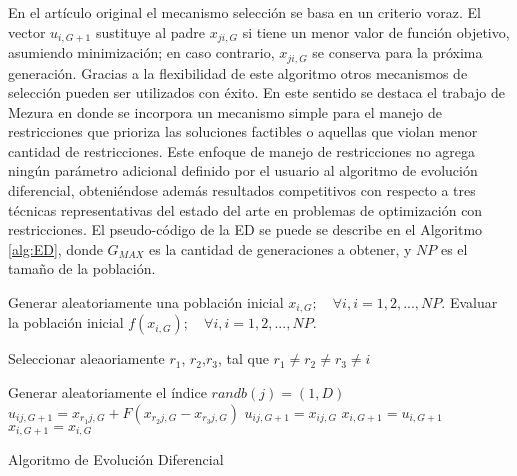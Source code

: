 En el artículo original el mecanismo selección se basa en un criterio voraz. El vector $u_{i,G+1}$ sustituye al padre  $x_{ji,G}$ si tiene un menor valor de función objetivo, asumiendo minimización; en caso contrario, $x_{ji,G}$ se conserva para la próxima generación. Gracias a la flexibilidad de este algoritmo otros mecanismos de selección pueden ser utilizados con éxito. En este sentido se destaca el trabajo de Mezura en \cite{mezura2004simple} donde se incorpora un mecanismo simple para el manejo de restricciones que prioriza las soluciones factibles o aquellas que violan menor cantidad de restricciones. Este enfoque de manejo de restricciones no agrega ningún parámetro adicional definido por el usuario al algoritmo de evolución diferencial, obteniéndose además resultados competitivos con respecto a tres técnicas representativas del estado del arte en problemas de optimización con restricciones. El pseudo-código de la ED se puede se describe en el Algoritmo \ref{alg:ED}, donde $G_{MAX}$ es la cantidad de generaciones a obtener, y $NP$ es el tamaño de la población.
\begin{algorithm}
	\begin{algorithmic}[1]
		\STATE Generar aleatoriamente una población inicial $x_{i,G}; \quad \forall i,i = 1, 2, ..., NP$. 
        \STATE Evaluar la población inicial $f(x_{i,G}); \quad  \forall i,i = 1, 2, ..., NP$. 

             \STATE Seleccionar aleaoriamente $r_1$, $r_2$,$r_3$, tal que $ r_1 \neq r_2 \neq r_3  \neq i$
             
             \STATE Generar aleatoriamente el índice $randb(j)=(1,D)$ 
              	\STATE $u_{ij,G+1} = x_{r_1j,G} + F (x_{r_2 j ,G}-x_{r_3 j,G})$
              	\ELSE 
                  \STATE $u_{ij,G+1} = x_{ij,G}$
                \ENDIF
              \ENDFOR
                  \STATE $x_{i,G+1} = u_{i,G+1}$
                  \ELSE
                 \STATE $x_{i,G+1} = x_{i,G}$
               \ENDIF
           \ENDFOR
          \ENDFOR
        
	\end{algorithmic}
	\caption{Algoritmo de Evolución Diferencial}\label{alg:ED}
\end{algorithm}


